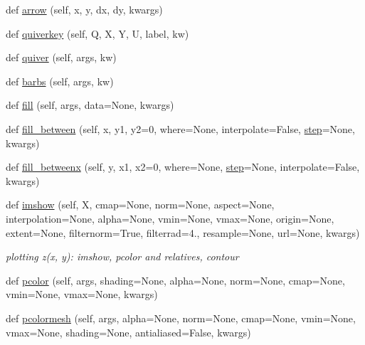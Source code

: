 \begin{DoxyCompactItemize}
\item 
def \hyperlink{classmatplotlib_1_1axes_1_1__axes_1_1Axes_a1e1a4dc223dbd358ae1490e433132d43}{arrow} (self, x, y, dx, dy, kwargs)
\item 
def \hyperlink{classmatplotlib_1_1axes_1_1__axes_1_1Axes_af0c003ef885208c0dadf023810242860}{quiverkey} (self, Q, X, Y, U, label, kw)
\item 
def \hyperlink{classmatplotlib_1_1axes_1_1__axes_1_1Axes_ae148559322ca3daf3b5e066a78e3130d}{quiver} (self, args, kw)
\item 
def \hyperlink{classmatplotlib_1_1axes_1_1__axes_1_1Axes_a35f40a06eff616203d4a9baa3f452c28}{barbs} (self, args, kw)
\item 
def \hyperlink{classmatplotlib_1_1axes_1_1__axes_1_1Axes_a97f36c68f65067af3a6254251f4c1018}{fill} (self, args, data=None, kwargs)
\item 
def \hyperlink{classmatplotlib_1_1axes_1_1__axes_1_1Axes_a20fb2b3a2ccb7e67d5c96fe9452eb2e0}{fill\+\_\+between} (self, x, y1, y2=0, where=None, interpolate=False, \hyperlink{classmatplotlib_1_1axes_1_1__axes_1_1Axes_a1e0d2f9a2b9a28defee1c8632c5db143}{step}=None, kwargs)
\item 
def \hyperlink{classmatplotlib_1_1axes_1_1__axes_1_1Axes_ad08052cc941053821157e41f9c488577}{fill\+\_\+betweenx} (self, y, x1, x2=0, where=None, \hyperlink{classmatplotlib_1_1axes_1_1__axes_1_1Axes_a1e0d2f9a2b9a28defee1c8632c5db143}{step}=None, interpolate=False, kwargs)
\item 
def \hyperlink{classmatplotlib_1_1axes_1_1__axes_1_1Axes_a65e2a063891896069232333bc1bd5a2a}{imshow} (self, X, cmap=None, norm=None, aspect=None, interpolation=None, alpha=None, vmin=None, vmax=None, origin=None, extent=None, filternorm=True, filterrad=4., resample=None, url=None, kwargs)
\begin{DoxyCompactList}\small\item\em plotting z(x, y)\+: imshow, pcolor and relatives, contour \end{DoxyCompactList}\item 
def \hyperlink{classmatplotlib_1_1axes_1_1__axes_1_1Axes_a2016d429b2baefecafba03ab4c1b40fb}{pcolor} (self, args, shading=None, alpha=None, norm=None, cmap=None, vmin=None, vmax=None, kwargs)
\item 
def \hyperlink{classmatplotlib_1_1axes_1_1__axes_1_1Axes_ad65860a26dde3a86bf9c9112dd1079fd}{pcolormesh} (self, args, alpha=None, norm=None, cmap=None, vmin=None, vmax=None, shading=None, antialiased=False, kwargs)
\item 

\end{DoxyCompactItemize}
